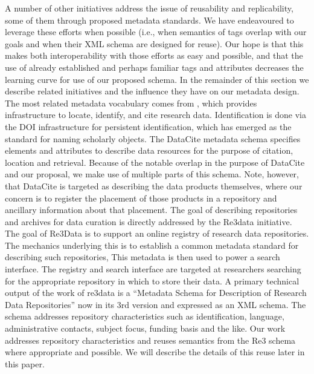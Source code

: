 A number of other initiatives address the issue of reusability and replicability, some of them through proposed metadata standards.  We have endeavoured to leverage these efforts when possible (i.e., when semantics of tags overlap with our goals and when their XML schema are designed for reuse).  Our hope is that this makes both interoperability with those efforts as easy and possible, and that the use of already established and perhaps familiar tags and attributes decreases the learning curve for use of our proposed schema.  In the remainder of this section we describe related initiatives and the influence they have on our metadata design.
The most related metadata vocabulary comes from , which provides infrastructure to locate, identify, and cite research data. Identification is done via the DOI infrastructure for persistent identification, which has emerged as the standard for naming scholarly objects.  The DataCite metadata schema \parencite{DataCiteMetadataWorkingGroupDataCiteMetadataSchema2017a,DataCiteMetadataWorkingGroupDataCiteMetadataSchema2017} specifies elements and attributes to describe data resources for the purpose of citation, location and retrieval.  Because of the notable overlap in the purpose of DataCite  and our proposal, we make use of multiple parts of this schema. Note, however, that DataCite is targeted as describing the data products themselves, where our concern is to register the placement of those products in a repository and ancillary information about that placement.
The goal of describing repositories and archives for data curation is directly addressed by the Re3data \parencite{RucknagelMetadataSchemaDescription2015,Re3data.Orgre3dataorgMetadata2015} initiative.  The goal of Re3Data is to support an online registry of research data repositories.   The mechanics underlying this is to establish a common metadata standard for describing such repositories, This metadata is then used to power a search interface.  The registry and search interface are targeted at researchers searching for the appropriate repository in which to store their data.
A primary technical output of the work of re3data is a ``Metadata Schema for Description of Research Data Repositories'' now in its 3rd version and expressed as an XML schema.  The schema addresses repository characteristics such as identification,   language, administrative contacts, subject focus, funding basis and the like.  Our work addresses repository characteristics and reuses semantics from the Re3 schema where appropriate and possible.  We will describe the details of this reuse later in this paper.
